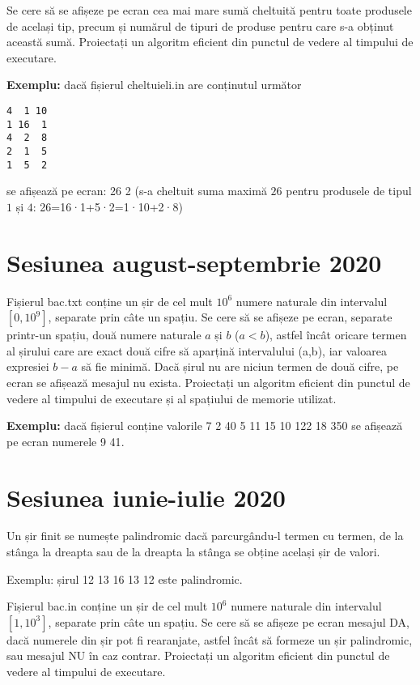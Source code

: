 \documentclass[10pt, a4paper]{article}
\newcommand{\highlight}[1]{{\ttfamily\color{red}#1}}
\begin{document}
\vspace{0.2cm}
\noindent Se cere să se afișeze pe ecran cea mai mare sumă cheltuită pentru toate produsele de același tip, precum și numărul de tipuri de produse pentru care s-a obținut această sumă. Proiectați un algoritm eficient din punctul de vedere al timpului de executare.

\vspace{0.2cm}
\noindent \textbf{Exemplu:} dacă fișierul \highlight{cheltuieli.in} are conținutul următor
\begin{verbatim}
4  1 10
1 16  1
4  2  8
2  1  5
1  5  2
\end{verbatim}
se afișează pe ecran: \highlight{26 2} (s-a cheltuit suma maximă \highlight{$26$} pentru produsele de tipul \highlight{$1$} și \highlight{$4$}: \highlight{26=16·1+5·2=1·10+2·8})

\section{Sesiunea august-septembrie 2020}
Fișierul {bac.txt} conține un șir de cel mult \highlight{$10^6$} numere naturale din intervalul \highlight{$[0,10^9]$}, separate prin câte un spațiu. Se cere să se afișeze pe ecran, separate printr-un spațiu, două numere naturale \highlight{$a$} și \highlight{$b$} (\highlight{$a < b$}), astfel încât oricare termen al șirului care are exact două cifre să aparțină intervalului \highlight{(a,b)}, iar valoarea expresiei \highlight{$b-a$} să fie minimă. Dacă șirul nu are niciun termen de două cifre, pe ecran se afișează mesajul \highlight{nu exista}. Proiectați un algoritm eficient din punctul de vedere al timpului de executare și al spațiului de memorie utilizat.

\vspace{0.2cm}
\noindent \textbf{Exemplu:} dacă fișierul conține valorile \highlight{7 2 40 5 11 15 10 122 18 350} se afișează pe ecran numerele \highlight{9 41}.


\section{Sesiunea iunie-iulie 2020}
Un șir finit se numește palindromic dacă parcurgându-l termen cu termen, de la stânga la dreapta sau de la dreapta la stânga se obține același șir de valori.

\noindent Exemplu: șirul \highlight{12 13 16 13 12} este palindromic.

\vspace{0.2cm}
\noindent Fișierul \highlight{bac.in} conține un șir de cel mult \highlight{$10^6$} numere naturale din intervalul \highlight{$[1,10^3]$}, separate prin câte un spațiu. Se cere să se afișeze pe ecran mesajul \highlight{DA}, dacă numerele din șir pot fi rearanjate, astfel încât să formeze un șir palindromic, sau mesajul \highlight{NU} în caz contrar. Proiectați un algoritm eficient din punctul de vedere al timpului de executare.
\end{document}

